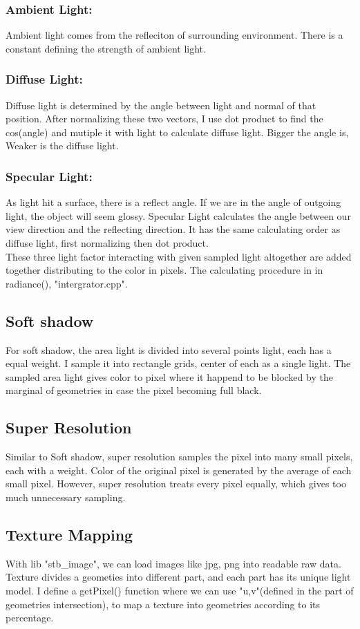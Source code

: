 \documentclass[acmtog]{acmart}
\begin{document}
\subsubsection{Ambient Light: }
Ambient light comes from the refleciton of surrounding environment. There is a constant defining the strength of ambient light.
\subsubsection{Diffuse Light: }
Diffuse light is determined by the angle between light and normal of that position. After normalizing these two vectors, I use dot product to find the cos(angle) and mutiple it with light to calculate diffuse light. Bigger the angle is, Weaker is the diffuse light.
\subsubsection{Specular Light: }
As light hit a surface, there is a reflect angle. If we are in the angle of outgoing light, the object will seem glossy. Specular Light calculates the angle between our view direction and the reflecting direction. It has the same calculating order as diffuse light, first normalizing then dot product.\\
These three light factor interacting with given sampled light altogether are added together distributing to the color in pixels. The calculating procedure in in radiance(), "intergrator.cpp".
\subsection{Soft shadow}
For soft shadow, the area light is divided into several points light, each has a equal weight. I sample it into rectangle grids, center of each as a single light. The sampled area light gives color to pixel where it happend to be blocked by the marginal of geometries in case the pixel becoming full black.
\subsection{Super Resolution}
Similar to Soft shadow, super resolution samples the pixel into many small pixels, each with a weight. Color of the original pixel is generated by the average of each small pixel. However, super resolution treats every pixel equally, which gives too much unnecessary sampling.
\subsection{Texture Mapping}
With lib "stb\_image", we can load images like jpg, png into readable raw data. Texture divides a geometies into different part, and each part has its unique light model. I define a getPixel() function where we can use "u,v"(defined in the part of geometries intersection), to map a texture into geometries according to its percentage.
\end{document}
